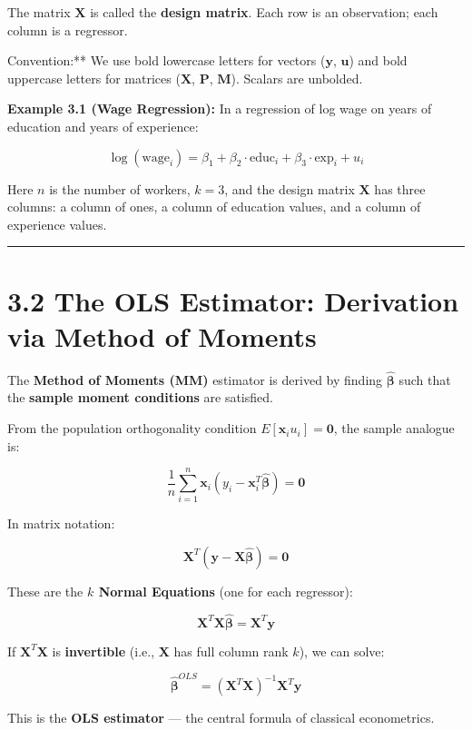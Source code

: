 The matrix $\mathbf{X}$ is called the \textbf{design matrix}. Each row is an observation; each column is a regressor.

\begin{keybox}{Convention:** We use bold lowercase letters for vectors ($\mathbf{y}$, $\mathbf{u}$) and bold uppercase letters for matrices ($\mathbf{X}$, $\mathbf{P}$, $\mathbf{M}$). Scalars are unbolded.}
\end{keybox}

\textbf{Example 3.1 (Wage Regression):} In a regression of log wage on years of education and years of experience:

\[
\log(\text{wage}_i) = \beta_1 + \beta_2 \cdot \text{educ}_i + \beta_3 \cdot \text{exp}_i + u_i
\]

Here $n$ is the number of workers, $k = 3$, and the design matrix $\mathbf{X}$ has three columns: a column of ones, a column of education values, and a column of experience values.

\medskip\hrule\medskip

\section{3.2 The OLS Estimator: Derivation via Method of Moments}

The \textbf{Method of Moments (MM)} estimator is derived by finding $\hat{\boldsymbol{\beta}}$ such that the \textbf{sample moment conditions} are satisfied.

From the population orthogonality condition $E[\mathbf{x}_i u_i] = \mathbf{0}$, the sample analogue is:

\[
\frac{1}{n} \sum_{i=1}^n \mathbf{x}_i (y_i - \mathbf{x}_i^T \hat{\boldsymbol{\beta}}) = \mathbf{0}
\]

In matrix notation:

\[
\mathbf{X}^T (\mathbf{y} - \mathbf{X}\hat{\boldsymbol{\beta}}) = \mathbf{0}
\]

These are the \textbf{$k$ Normal Equations} (one for each regressor):

\[
\mathbf{X}^T \mathbf{X} \hat{\boldsymbol{\beta}} = \mathbf{X}^T \mathbf{y}
\]

If $\mathbf{X}^T \mathbf{X}$ is \textbf{invertible} (i.e., $\mathbf{X}$ has full column rank $k$), we can solve:

\[
\boxed{\hat{\boldsymbol{\beta}}^{OLS} = (\mathbf{X}^T \mathbf{X})^{-1} \mathbf{X}^T \mathbf{y}}
\]

This is the \textbf{OLS estimator} --- the central formula of classical econometrics.

